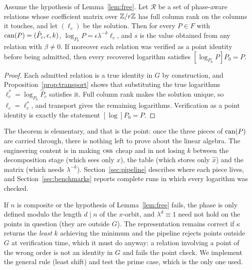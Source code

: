 \begin{theorem}
\label{thm:reconstruct}
Assume the hypothesis of Lemma~\ref{lem:free}. Let $\mathcal R$ be a
set of phase-aware relations whose coefficient matrix over $\mathbb{Z}/r\mathbb{Z}$
has full column rank on the columns it touches, and let
$(\ell_c)$ be the solution. Then for every $P\in F$ with
$\operatorname{can}(P)=(\hat P_c,\epsilon,k)$,
$\log_{P_0}P=\epsilon\lambda^{-k}\ell_c$, and $s$ is the value
obtained from any relation with $\beta\ne0$. If moreover each relation
was verified as a point identity before being admitted, then every
recovered logarithm satisfies $[\log_{P_0}P]P_0=P$.
\end{theorem}
\begin{proof}
Each admitted relation is a true identity in $G$ by construction, and
Proposition~\ref{prop:transport} shows that substituting the true
logarithms $\ell_c^\ast=\log_{P_0}\hat P_c$ satisfies it. Full column
rank makes the solution unique, so $\ell_c=\ell_c^\ast$, and
transport gives the remaining logarithms. Verification as a point
identity is exactly the statement $[\log]P_0=P$.
\end{proof}

The theorem is elementary, and that is the point: once the three
pieces of $\operatorname{can}(P)$ are carried through, there is nothing left to
prove about the linear algebra. The engineering content is in making
$\operatorname{can}$ cheap and in not losing $k$ between the decomposition stage
(which sees only $x$), the table (which stores only $\hat x$) and the
matrix (which needs $\lambda^{-k}$). Section~\ref{sec:pipeline}
describes where each piece lives, and Section~\ref{sec:benchmarks}
reports complete runs in which every logarithm was checked.

\begin{remark}
If $n$ is composite or the hypothesis of Lemma~\ref{lem:free} fails,
the phase is only defined modulo the length $d\mid n$ of the
$x$-orbit, and $\lambda^d\equiv1$ need not hold on the points in
question (they are outside $G$). The representation remains correct if
$\kappa$ returns the \emph{least} $k$ achieving the minimum and the
pipeline rejects points outside $G$ at verification time, which it
must do anyway: a relation involving a point of the wrong order is not
an identity in $G$ and fails the point check. We implement the general
rule (least shift) and test the prime case, which is the only one
used.
\end{remark}

